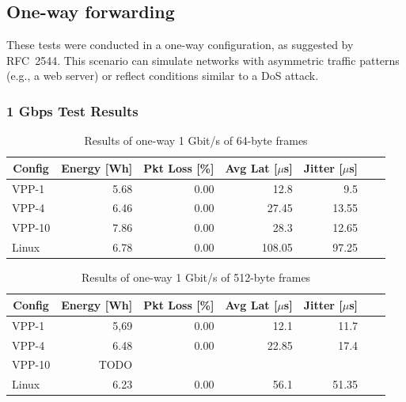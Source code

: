 \subsection{One-way forwarding}

These tests were conducted in a one-way configuration, as suggested by RFC~2544\cite{rfc2544}.
This scenario can simulate networks with asymmetric traffic patterns (e.g., a web server) or reflect conditions similar to a DoS attack.

\subsubsection{1 Gbps Test Results}

\begin{table}[h!]
\centering
\caption{Results of one-way 1 Gbit/s of 64-byte frames}
\begin{tabular}{|l|r|r|r|r|r|r|}
\hline
\multicolumn{1}{|c|}{\textbf{Config}} &
\multicolumn{1}{c|}{\textbf{Energy [Wh] }} &
\multicolumn{1}{c|}{\textbf{Pkt Loss [\%]}} &
\multicolumn{1}{c|}{\textbf{Avg Lat [$\mu$s]}} &
\multicolumn{1}{c|}{\textbf{Jitter [$\mu$s]}} \\
\hline 
VPP-1 & 5.68 & 0.00 & 12.8 & 9.5 \\
VPP-4 & 6.46 & 0.00 & 27.45 & 13.55 \\
VPP-10 & 7.86 & 0.00 & 28.3 & 12.65 \\
Linux & 6.78 & 0.00 & 108.05 & 97.25 \\
\hline
\end{tabular}
\label{tab:1udp:64B}
\end{table}


\begin{table}[h!]
\centering
\caption{Results of one-way 1 Gbit/s of 512-byte frames}
\begin{tabular}{|l|r|r|r|r|r|r|}
\hline
\multicolumn{1}{|c|}{\textbf{Config}} &
\multicolumn{1}{c|}{\textbf{Energy [Wh] }} &
\multicolumn{1}{c|}{\textbf{Pkt Loss [\%]}} &
\multicolumn{1}{c|}{\textbf{Avg Lat [$\mu$s]}} &
\multicolumn{1}{c|}{\textbf{Jitter [$\mu$s]}} \\
\hline 
VPP-1 & 5,69 & 0.00 & 12.1 & 11.7 \\
VPP-4 & 6.48 & 0.00 & 22.85 & 17.4 \\
VPP-10 & TODO &  &  &  \\
Linux & 6.23 & 0.00 & 56.1 & 51.35 \\
\hline
\end{tabular}
\label{tab:1udp:512B}
\end{table}


